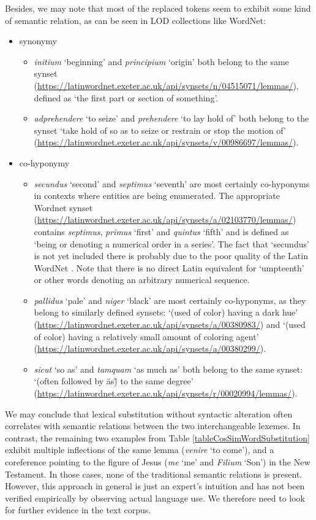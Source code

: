 Besides, we may note that most of the replaced tokens seem to exhibit some kind of semantic relation, as can be seen in \gls{LOD} collections like WordNet:
\begin{itemize}
	\item synonymy
	\begin{itemize}
		\item \textit{initium} `beginning' and \textit{principium} `origin' both belong to the same synset (\url{https://latinwordnet.exeter.ac.uk/api/synsets/n/04515071/lemmas/}), defined as `the first part or section of something'.
		\item \textit{adprehendere} `to seize' and \textit{prehendere} `to lay hold of' both belong to the synset `take hold of so as to seize or restrain or stop the motion of' (\url{https://latinwordnet.exeter.ac.uk/api/synsets/v/00986697/lemmas/}).
	\end{itemize}
	\item co-hyponymy
	\begin{itemize}
		\item \textit{secundus} `second' and \textit{septimus} `seventh' are most certainly co-hyponyms in contexts where entities are being enumerated. The appropriate Wordnet synset (\url{https://latinwordnet.exeter.ac.uk/api/synsets/a/02103770/lemmas/}) contains \textit{septimus}, \textit{primus} `first' and \textit{quintus} `fifth' and is defined as `being or denoting a numerical order in a series'. The fact that `secundus' is not yet included there is probably due to the poor quality of the Latin WordNet \parencite[4]{franziniNuncEstAestimandum2019}. Note that there is no direct Latin equivalent for `umpteenth' or other words denoting an arbitrary numerical sequence.
		\item \textit{pallidus} `pale' and \textit{niger} `black' are most certainly co-hyponyms, as they belong to similarly defined synsets: `(used of color) having a dark hue' (\url{https://latinwordnet.exeter.ac.uk/api/synsets/a/00380983/}) and `(used of color) having a relatively small amount of coloring agent' (\url{https://latinwordnet.exeter.ac.uk/api/synsets/a/00380299/}).
		\item \textit{sicut} `so as' and \textit{tamquam} `as much as' both belong to the same synset: `(often followed by \"as\") to the same degree' (\url{https://latinwordnet.exeter.ac.uk/api/synsets/r/00020994/lemmas/}).
	\end{itemize}
\end{itemize}
We may conclude that lexical substitution without syntactic alteration often correlates with semantic relations between the two interchangeable lexemes. In contrast, the remaining two examples from Table \ref{tableCosSimWordSubstitution} exhibit multiple inflections of the same lemma (\textit{venire} `to come'), and a coreference pointing to the figure of Jesus (\textit{me} `me' and \textit{Filium} `Son') in the New Testament. In those cases, none of the traditional semantic relations is present. However, this approach in general is just an expert's intuition and has not been verified empirically by observing actual language use. We therefore need to look for further evidence in the text corpus.


